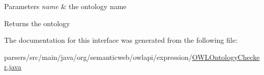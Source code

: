 \begin{DoxyParams}{Parameters}
{\em name} & the ontology name \\
\hline
\end{DoxyParams}
\begin{DoxyReturn}{Returns}
the ontology 
\end{DoxyReturn}


The documentation for this interface was generated from the following file\-:\begin{DoxyCompactItemize}
\item 
parsers/src/main/java/org/semanticweb/owlapi/expression/\hyperlink{_o_w_l_ontology_checker_8java}{O\-W\-L\-Ontology\-Checker.\-java}\end{DoxyCompactItemize}
